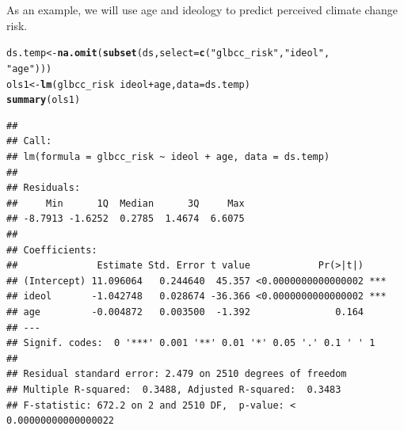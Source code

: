 \documentclass[11pt,openany]{book}\usepackage[]{graphicx}\usepackage[]{color}
\makeatletter
\newcommand{\hlstr}[1]{\textcolor[rgb]{0.192,0.494,0.8}{#1}}%
\newcommand{\hlopt}[1]{\textcolor[rgb]{0,0,0}{#1}}%
\newcommand{\hlstd}[1]{\textcolor[rgb]{0.345,0.345,0.345}{#1}}%
\newcommand{\hlkwb}[1]{\textcolor[rgb]{0.69,0.353,0.396}{#1}}%
\newcommand{\hlkwc}[1]{\textcolor[rgb]{0.333,0.667,0.333}{#1}}%
\newcommand{\hlkwd}[1]{\textcolor[rgb]{0.737,0.353,0.396}{\textbf{#1}}}%
\newenvironment{kframe}{%
 \def\at@end@of@kframe{}%
 \ifinner\ifhmode%
  \def\at@end@of@kframe{\end{minipage}}%
  \begin{minipage}{\columnwidth}%
 \fi\fi%
 \def\FrameCommand##1{\hskip\@totalleftmargin \hskip-\fboxsep
 \colorbox{shadecolor}{##1}\hskip-\fboxsep
     \hskip-\linewidth \hskip-\@totalleftmargin \hskip\columnwidth}%
 \MakeFramed {\advance\hsize-\width
   \@totalleftmargin\z@ \linewidth\hsize
   \@setminipage}}%
 {\par\unskip\endMakeFramed%
 \at@end@of@kframe}
\newenvironment{knitrout}{}{} %
\renewenvironment{knitrout}{\begin{singlespace}}{\end{singlespace}} %
\makeatother
\begin{document}
\begin{grbox}
\end{grbox}

As an example, we will use age and ideology to predict perceived climate change risk. 

\begin{knitrout}
\color{fgcolor}\begin{kframe}
\begin{alltt}
\hlstd{ds.temp} \hlkwb{<-} \hlkwd{na.omit}\hlstd{(}\hlkwd{subset}\hlstd{(ds,} \hlkwc{select} \hlstd{=} \hlkwd{c}\hlstd{(}\hlstr{"glbcc_risk"}\hlstd{,} \hlstr{"ideol"}\hlstd{,}
    \hlstr{"age"}\hlstd{)))}
\hlstd{ols1} \hlkwb{<-} \hlkwd{lm}\hlstd{(glbcc_risk} \hlopt{~} \hlstd{ideol} \hlopt{+} \hlstd{age,} \hlkwc{data} \hlstd{= ds.temp)}
\hlkwd{summary}\hlstd{(ols1)}
\end{alltt}
\begin{verbatim}
## 
## Call:
## lm(formula = glbcc_risk ~ ideol + age, data = ds.temp)
## 
## Residuals:
##     Min      1Q  Median      3Q     Max 
## -8.7913 -1.6252  0.2785  1.4674  6.6075 
## 
## Coefficients:
##              Estimate Std. Error t value            Pr(>|t|)    
## (Intercept) 11.096064   0.244640  45.357 <0.0000000000000002 ***
## ideol       -1.042748   0.028674 -36.366 <0.0000000000000002 ***
## age         -0.004872   0.003500  -1.392               0.164    
## ---
## Signif. codes:  0 '***' 0.001 '**' 0.01 '*' 0.05 '.' 0.1 ' ' 1
## 
## Residual standard error: 2.479 on 2510 degrees of freedom
## Multiple R-squared:  0.3488,	Adjusted R-squared:  0.3483 
## F-statistic: 672.2 on 2 and 2510 DF,  p-value: < 0.00000000000000022
\end{verbatim}
\end{kframe}
\end{knitrout}
\end{document}
